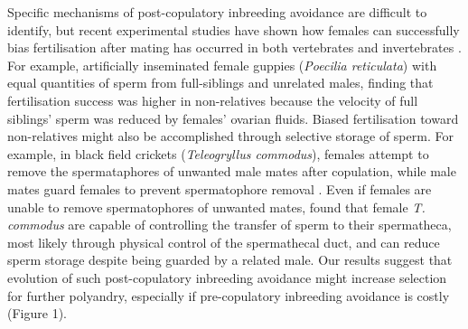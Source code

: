 \documentclass[10pt,letterpaper]{article}
\begin{document}
Specific mechanisms of post-copulatory inbreeding avoidance are difficult to identify, but recent experimental studies have shown how females can successfully bias fertilisation after mating has occurred in both vertebrates \cite[e.g.,][]{Gasparini2011} and invertebrates \cite[e.g.,][]{Tuni2013}. For example, \cite{Gasparini2011} artificially inseminated female guppies (\textit{Poecilia reticulata}) with equal quantities of sperm from full-siblings and unrelated males, finding that fertilisation success was higher in non-relatives because the velocity of full siblings' sperm was reduced by females' ovarian fluids. Biased fertilisation toward non-relatives might also be accomplished through selective storage of sperm. For example, in black field crickets (\textit{Teleogryllus commodus}), females attempt to remove the spermataphores of unwanted male mates after copulation, while male mates guard females to prevent spermatophore removal \cite[][]{Bussiere2006}. Even if females are unable to remove spermatophores of unwanted mates, \cite{Tuni2013} found that female \textit{T. commodus} are capable of controlling the transfer of sperm to their spermatheca, most likely through physical control of the spermathecal duct, and can reduce sperm storage despite being guarded by a related male. Our results suggest that evolution of such post-copulatory inbreeding avoidance might increase selection for further polyandry, especially if pre-copulatory inbreeding avoidance is costly (Figure 1).
\end{document}
